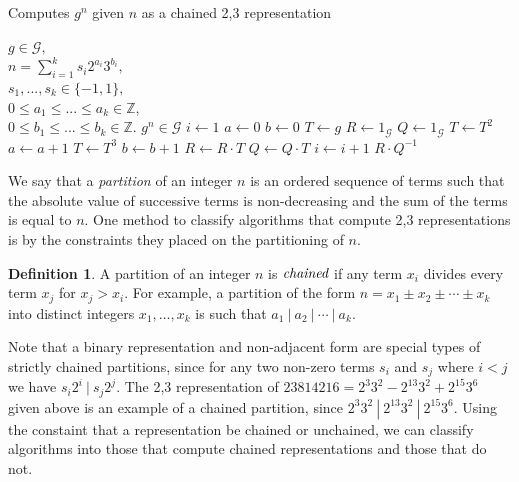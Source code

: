 \documentclass{ucalgthes1}
\theoremstyle{plain}
\theoremstyle{definition}
\newtheorem{defn}[thm]{Definition}
\newcommand{\ZZ}{\mathbb{Z}}
\begin{document}
\begin{algorithm}[htb!]
\caption{Computes $g^n$ given $n$ as a chained 2,3 representation}\label{alg:expWithChain}
\begin{algorithmic}[1]
\REQUIRE $g \in \mathcal G,$ \\
$n = \sum_{i=1}^k s_i2^{a_i}3^{b_i},$ \\
$s_1,...,s_k \in \{-1, 1\},$ \\
$0 \le a_1 \le ...\le a_k \in \ZZ,$ \\
$0 \le b_1 \le ... \le b_k \in \ZZ.$
\ENSURE $g^n \in \mathcal G$
\STATE $i \gets 1$
\STATE $a \gets 0$ 
\STATE $b \gets 0$ 
\STATE $T \gets g$ 
\STATE $R \gets 1_{\mathcal G}$ 
\STATE $Q \gets 1_{\mathcal G}$ 
		\STATE $T \gets T^2$
		\STATE $a \gets a + 1$
	\ENDWHILE
		\STATE $T \gets T^3$
		\STATE $b \gets b + 1$
	\ENDWHILE
		\STATE $R \gets R \cdot T$
	\ELSE
		\STATE $Q \gets Q \cdot T$
	\ENDIF
	\STATE $i \gets i + 1$
\ENDWHILE
\RETURN $R \cdot Q^{-1}$
\end{algorithmic}
\end{algorithm}

We say that a \emph{partition} of an integer $n$ is an ordered sequence of terms such that the absolute value of successive terms is non-decreasing and the sum of the terms is equal to $n$.  One method to classify algorithms that compute 2,3 representations is by the constraints they placed on the partitioning of $n$.

\begin{defn}
A partition of an integer $n$ is $\emph{chained}$ if any term $x_i$ divides every term $x_j$ for $x_j > x_i$.  For example, a partition of the form $n = x_1 \pm x_2 \pm \cdots \pm x_k$ into distinct integers $x_1,\dots, x_k$ is such that $a_1 ~|~ a_2 ~|~ \cdots ~|~ a_k$.
\end{defn}

\noindent
Note that a binary representation and non-adjacent form are special types of strictly chained partitions, since for any two non-zero terms $s_i$ and $s_j$ where $i < j$ we have $s_i2^i ~|~ s_j2^j$.  The 2,3 representation of $23814216 = 2^3 3^2 - 2^{13} 3^2 + 2^{15} 3^6$ given above is an example of a chained partition, since $2^3 3^2 ~|~ 2^{13} 3^2 ~|~ 2^{15} 3^6$.  Using the constaint that a representation be chained or unchained, we can classify algorithms into those that compute chained representations and those that do not.
\end{document}
